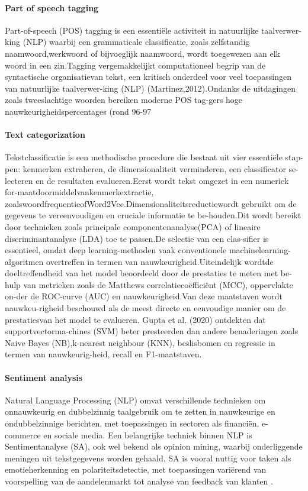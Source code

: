 \paragraph{Part of speech tagging}
Part-of-speech (POS) tagging is een essentiële activiteit in natuurlijke taalverwer-king (NLP) waarbij een grammaticale classificatie, zoals zelfstandig naamwoord,werkwoord of bijvoeglijk naamwoord, wordt toegewezen aan elk woord in een zin.Tagging vergemakkelijkt computationeel begrip van de syntactische organisatievan tekst, een kritisch onderdeel voor veel toepassingen van natuurlijke taalverwer-king (NLP) (Martinez,2012).Ondanks de uitdagingen zoals tweeslachtige woorden bereiken moderne POS tag-gers hoge nauwkeurigheidspercentages (rond 96-97%
\paragraph{Text categorization}
Tekstclassificatie is een methodische procedure die bestaat uit vier essentiële stap-pen: kenmerken extraheren, de dimensionaliteit verminderen, een classificator se-lecteren en de resultaten evalueren.Eerst wordt tekst omgezet in een numeriek for-maatdoormiddelvankenmerkextractie, zoalswoordfrequentieofWord2Vec.Dimensionaliteitsreductiewordt gebruikt om de gegevens te vereenvoudigen en cruciale informatie te be-houden.Dit wordt bereikt door technieken zoals principale componentenanalyse(PCA) of lineaire discriminantanalyse (LDA) toe te passen.De selectie van een clas-sifier is essentieel, omdat deep learning-methoden vaak conventionele machinelearning-algoritmen overtreffen in termen van nauwkeurigheid.Uiteindelijk wordtde doeltreffendheid van het model beoordeeld door de prestaties te meten met be-hulp van metrieken zoals de Matthews correlatiecoëfficiënt (MCC), oppervlakte on-der de ROC-curve (AUC) en nauwkeurigheid.Van deze maatstaven wordt nauwkeu-righeid beschouwd als de meest directe en eenvoudige manier om de prestatiesvan het model te evalueren. Gupta et al. (2020) ontdekten dat supportvectorma-chines (SVM) beter presteerden dan andere benaderingen zoals Naive Bayes (NB),k-nearest neighbour (KNN), beslisbomen en regressie in termen van nauwkeurig-heid, recall en F1-maatstaven.
\paragraph{Sentiment analysis}
Natural Language Processing (NLP) omvat verschillende technieken om onnauwkeurig en dubbelzinnig taalgebruik om te zetten in nauwkeurige en ondubbelzinnige berichten, met toepassingen in sectoren als financiën, e-commerce en sociale media. Een belangrijke techniek binnen NLP is Sentimentanalyse (SA), ook wel bekend als opinion mining, waarbij onderliggende meningen uit tekstgegevens worden gehaald. SA is vooral nuttig voor taken als emotieherkenning en polariteitsdetectie, met toepassingen variërend van voorspelling van de aandelenmarkt tot analyse van feedback van klanten \autocite{Gupta2020}.

